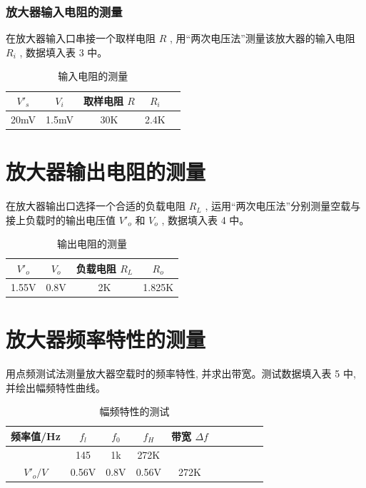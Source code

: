 \documentclass[10pt, a4paper]{article} %
\begin{document}
\subsubsection{放大器输入电阻的测量}

在放大器输入口串接一个取样电阻  $ R $ , 用“两次电压法”测量该放大器的输入电阻  $ R_i $ , 数据填入表 3 中。

\begin{table}[ht]
    \centering
    \caption{输入电阻的测量}
    \begin{tabular}{c|c|c|c|c}
        \toprule
         $ V'_s $  &  $ V_i $  & 取样电阻  $ R $  &  $ R_i $  \\
        \midrule
        20mV&1.5mV&30K&2.4K\\
        \bottomrule
    \end{tabular}
\end{table}



\section*{放大器输出电阻的测量}

在放大器输出口选择一个合适的负载电阻  $ R_L $ , 运用“两次电压法”分别测量空载与接上负载时的输出电压值  $ V'_o $  和  $ V_o $ , 数据填入表 4 中。

\begin{table}[ht]
    \centering
    \caption{输出电阻的测量}
    \begin{tabular}{cccc}
        \toprule
         $ V'_o $  &  $ V_o $  & 负载电阻  $ R_L $  &$R_o$\\
        \midrule
        1.55V&0.8V&2K&1.825K\\
        \bottomrule
    \end{tabular}
\end{table}
\newpage
\section*{放大器频率特性的测量}

用点频测试法测量放大器空载时的频率特性, 并求出带宽。测试数据填入表 5 中, 并绘出幅频特性曲线。

\begin{table}[ht]
    \centering
    \caption{幅频特性的测试}
    \begin{tabular}{cccccccccc}
        \toprule
        频率值/Hz &  $ f_l $  &  $ f_0 $  &  $ f_H $  & 带宽  $ \Delta f $  \\
        \midrule
        &145&1k&272K& \\
         $ V'_o/V $ &0.56V&0.8V&0.56V&272K\\
        \bottomrule
    \end{tabular}
\end{table}
\end{document}
